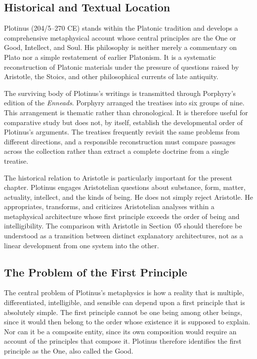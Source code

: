 \subsection{Historical and Textual Location}
\label{subsec:ch08-plotinus-historical}

\label{para:VS.B01.P01.C08.S06.SS01.P001}
Plotinus (204/5--270 CE) stands within the Platonic tradition and
develops a comprehensive metaphysical account whose central principles
are the One or Good, Intellect, and Soul. His philosophy is neither
merely a commentary on Plato nor a simple restatement of earlier
Platonism. It is a systematic reconstruction of Platonic materials
under the pressure of questions raised by Aristotle, the Stoics, and
other philosophical currents of late antiquity.

\label{para:VS.B01.P01.C08.S06.SS01.P002}
The surviving body of Plotinus's writings is transmitted through
Porphyry's edition of the \textit{Enneads}. Porphyry arranged the
treatises into six groups of nine. This arrangement is thematic rather
than chronological. It is therefore useful for comparative study but
does not, by itself, establish the developmental order of Plotinus's
arguments. The treatises frequently revisit the same problems from
different directions, and a responsible reconstruction must compare
passages across the collection rather than extract a complete doctrine
from a single treatise.

\label{para:VS.B01.P01.C08.S06.SS01.P003}
The historical relation to Aristotle is particularly important for
the present chapter. Plotinus engages Aristotelian questions about
substance, form, matter, actuality, intellect, and the kinds of being.
He does not simply reject Aristotle. He appropriates, transforms, and
criticizes Aristotelian analyses within a metaphysical architecture
whose first principle exceeds the order of being and intelligibility.
The comparison with Aristotle in Section~05 should therefore be
understood as a transition between distinct explanatory architectures,
not as a linear development from one system into the other.

\subsection{The Problem of the First Principle}
\label{subsec:ch08-plotinus-first-principle}

\label{para:VS.B01.P01.C08.S06.SS02.P001}
The central problem of Plotinus's metaphysics is how a reality that is
multiple, differentiated, intelligible, and sensible can depend upon
a first principle that is absolutely simple. The first principle cannot
be one being among other beings, since it would then belong to the
order whose existence it is supposed to explain. Nor can it be a
composite entity, since its own composition would require an account
of the principles that compose it. Plotinus therefore identifies the
first principle as the One, also called the Good.

